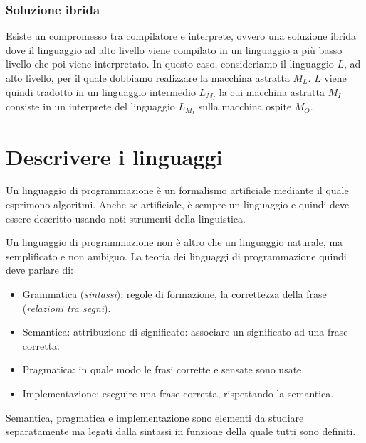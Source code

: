 \documentclass[oneside,a4paper,11pt]{book}
\theoremstyle{italicstyle}
\theoremstyle{normStyle}
\begin{document}
\subsection{Soluzione ibrida}
Esiste un compromesso tra compilatore e interprete, ovvero una soluzione 
ibrida dove il linguaggio ad alto livello viene compilato 
in un linguaggio a più basso livello che poi viene interpretato. 
In questo caso, consideriamo il linguaggio $L$, ad alto livello, per 
il quale dobbiamo realizzare la macchina astratta $M_L$. $L$ viene quindi 
tradotto in un linguaggio intermedio $L_{M_I}$ la cui macchina 
astratta $M_I$ consiste in un interprete del linguaggio $L_{M_I}$
sulla macchina ospite $M_O$.
\chapter{Descrivere i linguaggi}
Un linguaggio di programmazione è un formalismo artificiale 
mediante il quale esprimono algoritmi. Anche se artificiale, è sempre 
un linguaggio e quindi deve essere descritto usando noti strumenti 
della linguistica.

Un linguaggio di programmazione non è altro che un linguaggio naturale, ma 
semplificato e non ambiguo. La teoria dei linguaggi di programmazione 
quindi deve parlare di:
\begin{itemize}
  \item Grammatica (\textit{sintassi}): regole di formazione, la correttezza della 
  frase (\textit{relazioni tra segni}).
  \item Semantica: attribuzione di significato: associare un significato ad una 
  frase corretta.
  \item Pragmatica: in quale modo le frasi corrette e sensate sono usate.
  \item Implementazione: eseguire una frase corretta, rispettando 
  la semantica.
\end{itemize}
Semantica, pragmatica e implementazione sono elementi da studiare separatamente 
ma legati dalla sintassi in funzione della quale tutti sono definiti.
\end{document}
